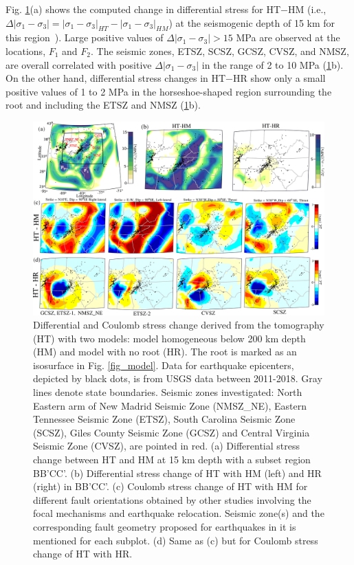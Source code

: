 \documentclass[draft,linenumbers]{agujournal2018}
\begin{document}
Fig. \ref{model_results}(a) shows the computed change in differential stress for HT$-$HM (i.e., $\Delta|\sigma_1 - \sigma_3| = |\sigma_1 - \sigma_3|_{HT} - |\sigma_1 - \sigma_3|_{HM}$) at the seismogenic depth of 15 km for this region~\citep[e.g.,][]{mazzotti2010state}). Large positive values of $\Delta |\sigma_1 - \sigma_3|>15$ MPa are observed at the locations, $F_1$ and $F_2$. The seismic zones, ETSZ, SCSZ, GCSZ, CVSZ, and NMSZ, are overall correlated with positive $\Delta |\sigma_1 - \sigma_3|$ in the range of 2 to 10 MPa (\ref{model_results}b). On the other hand, differential stress changes in HT$-$HR show only a small positive values of 1 to 2 MPa in the horseshoe-shaped region surrounding the root and including the ETSZ and NMSZ (\ref{model_results}b).
%
\begin{figure}[h!]
    \centering
    \includegraphics[width=\linewidth]{figures/model_results.png}
    \caption{Differential and Coulomb stress change derived from the tomography (HT) with two models: model homogeneous below 200 km depth (HM) and model with no root (HR). The root is marked as an isosurface in Fig. \ref{fig_model}. Data for earthquake epicenters, depicted by black dots, is from USGS data between 2011-2018.  Gray lines denote state boundaries. Seismic zones investigated: North Eastern arm of New Madrid Seismic Zone (NMSZ\_NE), Eastern Tennessee Seismic Zone (ETSZ), South Carolina Seismic Zone (SCSZ), Giles County Seismic Zone (GCSZ) and Central Virginia Seismic Zone (CVSZ), are pointed in red. (a) Differential stress change between HT and HM at 15 km depth with a subset region BB'CC'. (b) Differential stress change of HT with HM (left) and HR (right) in BB'CC'. (c) Coulomb stress change of HT with HM for different fault orientations obtained by other studies involving the focal mechanisms and earthquake relocation. Seismic zone(s) and the corresponding fault geometry proposed for earthquakes in it is mentioned for each subplot. (d) Same as (c) but for Coulomb stress change of HT with HR. }
    \label{model_results}
\end{figure}
\end{document}
